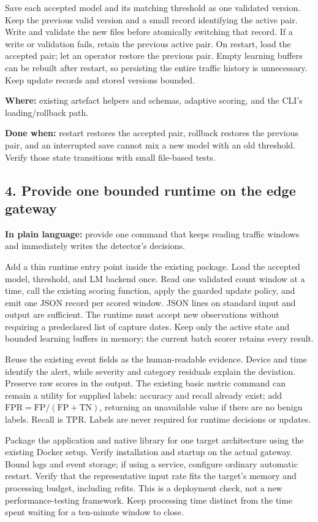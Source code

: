 \documentclass[11pt,a4paper]{article}
\begin{document}
Save each accepted model and its matching threshold as one validated version.
Keep the previous valid version and a small record identifying the active pair.
Write and validate the new files before atomically switching that record. If a
write or validation fails, retain the previous active pair. On restart, load the
accepted pair; let an operator restore the previous pair. Empty learning buffers
can be rebuilt after restart, so persisting the entire traffic history is
unnecessary. Keep update records and stored versions bounded.

\textbf{Where:} existing artefact helpers and schemas, adaptive scoring, and
the CLI's loading/rollback path.

\textbf{Done when:} restart restores the accepted pair, rollback restores the
previous pair, and an interrupted save cannot mix a new model with an old
threshold. Verify those state transitions with small file-based tests.

\subsection{4. Provide one bounded runtime on the edge gateway}

\textbf{In plain language:} provide one command that keeps reading traffic
windows and immediately writes the detector's decisions.

Add a thin runtime entry point inside the existing package. Load the accepted
model, threshold, and LM backend once. Read one validated count window at a time,
call the existing scoring function, apply the guarded update policy, and emit
one JSON record per scored window. JSON lines on standard input and output are
sufficient. The runtime must accept new observations without requiring a
predeclared list of capture dates. Keep only the active state and bounded
learning buffers in memory; the current batch scorer retains every result.

Reuse the existing event fields as the human-readable evidence. Device and time
identify the alert, while severity and category residuals explain the deviation.
Preserve raw scores in the output. The existing basic metric command can remain
a utility for supplied labels: accuracy and recall already exist; add
\(\mathrm{FPR}=\mathrm{FP}/(\mathrm{FP}+\mathrm{TN})\), returning an unavailable
value if there are no benign labels. Recall is TPR. Labels are never required
for runtime decisions or updates.

Package the application and native library for one target architecture using
the existing Docker setup. Verify installation and startup on the actual
gateway. Bound logs and event storage; if using a service, configure ordinary
automatic restart. Verify that the representative input rate fits the target's
memory and processing budget, including refits. This is a deployment check, not
a new performance-testing framework. Keep processing time distinct from the
time spent waiting for a ten-minute window to close.
\end{document}
